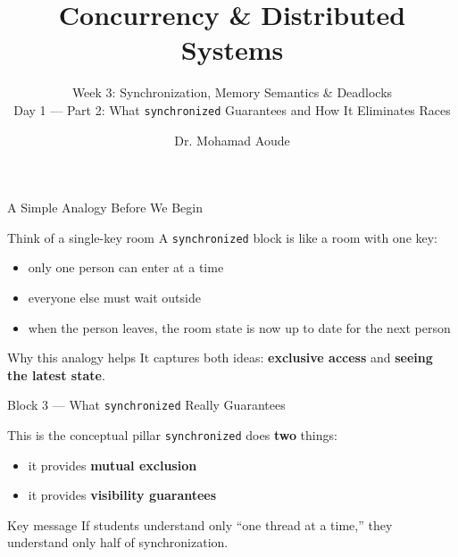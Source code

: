 \documentclass[aspectratio=169,11pt]{beamer}
\title{Concurrency \& Distributed Systems}
\subtitle{Week 3: Synchronization, Memory Semantics \& Deadlocks\\Day 1 --- Part 2: What \texttt{synchronized} Guarantees and How It Eliminates Races}
\author{Dr. Mohamad Aoude}
\institute{Lebanese University \\ Faculty of Engineering}
\date{}
\begin{document}
	
	\begin{frame}
		\titlepage
	\end{frame}
	
	\begin{frame}{A Simple Analogy Before We Begin}
		\begin{block}{Think of a single-key room}
			A \texttt{synchronized} block is like a room with one key:
			\begin{itemize}
				\item only one person can enter at a time
				\item everyone else must wait outside
				\item when the person leaves, the room state is now up to date for the next person
			\end{itemize}
		\end{block}
		
		\bigskip
		
		\begin{alertblock}{Why this analogy helps}
			It captures both ideas:
			\textbf{exclusive access} and \textbf{seeing the latest state}.
		\end{alertblock}
	\end{frame}
	
	\begin{frame}{Block 3 --- What \texttt{synchronized} Really Guarantees}
		\begin{block}{This is the conceptual pillar}
			\texttt{synchronized} does \textbf{two} things:
			\begin{itemize}
				\item it provides \textbf{mutual exclusion}
				\item it provides \textbf{visibility guarantees}
			\end{itemize}
		\end{block}
		
		\bigskip
		
		\begin{alertblock}{Key message}
			If students understand only “one thread at a time,” they understand only half of synchronization.
		\end{alertblock}
	\end{frame}
	
\end{document}
